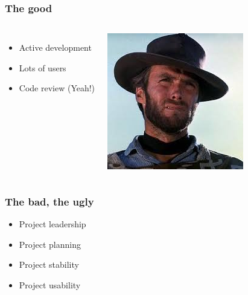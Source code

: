 \documentclass[14pt]{beamer}
\begin{document}
\begin{frame}
\frametitle{The good}
\begin{columns}
\begin{itemize}
\item Active development
\item Lots of users
\item Code review (Yeah!)
\end{itemize}
\includegraphics[width=\textwidth]{good.jpeg}
\end{columns}
\end{frame}

\begin{frame}
\frametitle{The bad, the ugly}
\begin{itemize}
\item Project leadership
\item Project planning
\item Project stability
\item Project usability
\end{itemize}
\end{frame}
\end{document}
